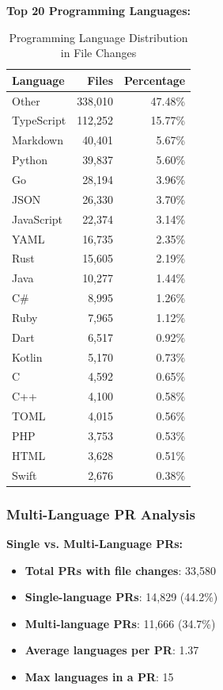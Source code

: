 \documentclass[11pt]{article}
\begin{document}
\textbf{Top 20 Programming Languages:}
\begin{table}[H]
\centering
\caption{Programming Language Distribution in File Changes}
\small
\begin{tabular}{@{}lrr@{}}
\toprule
\textbf{Language} & \textbf{Files} & \textbf{Percentage} \\
\midrule
Other & 338,010 & 47.48\% \\
TypeScript & 112,252 & 15.77\% \\
Markdown & 40,401 & 5.67\% \\
Python & 39,837 & 5.60\% \\
Go & 28,194 & 3.96\% \\
JSON & 26,330 & 3.70\% \\
JavaScript & 22,374 & 3.14\% \\
YAML & 16,735 & 2.35\% \\
Rust & 15,605 & 2.19\% \\
Java & 10,277 & 1.44\% \\
C\# & 8,995 & 1.26\% \\
Ruby & 7,965 & 1.12\% \\
Dart & 6,517 & 0.92\% \\
Kotlin & 5,170 & 0.73\% \\
C & 4,592 & 0.65\% \\
C++ & 4,100 & 0.58\% \\
TOML & 4,015 & 0.56\% \\
PHP & 3,753 & 0.53\% \\
HTML & 3,628 & 0.51\% \\
Swift & 2,676 & 0.38\% \\
\bottomrule
\end{tabular}
\end{table}

\subsubsection{Multi-Language PR Analysis}

\textbf{Single vs. Multi-Language PRs:}
\begin{itemize}
    \item \textbf{Total PRs with file changes}: 33,580
    \item \textbf{Single-language PRs}: 14,829 (44.2\%)
    \item \textbf{Multi-language PRs}: 11,666 (34.7\%)
    \item \textbf{Average languages per PR}: 1.37
    \item \textbf{Max languages in a PR}: 15
\end{itemize}
\end{document}
